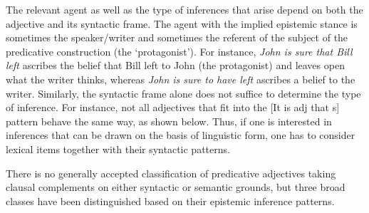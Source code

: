 \documentclass[10pt]{article}
\begin{document}
The relevant agent as well as the type of inferences that arise depend
on both the adjective and its syntactic frame.  The agent with the
implied epistemic stance is sometimes the speaker/writer and sometimes
the referent of the subject of the predicative construction (the
`protagonist').  For instance, \textit{John is sure that Bill left}
ascribes the belief that Bill left to John (the protagonist) and
leaves open what the writer thinks, whereas \textit{John is sure to have
left} ascribes a belief to the writer. Similarly, the syntactic frame
alone does not suffice to determine the type of inference. For
instance, not all adjectives that fit into the [It is {\sc adj} that
  {\sc s}] pattern behave the same way, as shown below.  Thus, if one
is interested in inferences that can be drawn on the basis of
linguistic form, one has to consider lexical items together with their
syntactic patterns.

There is no generally accepted classification of predicative adjectives taking clausal complements on either syntactic or semantic grounds, but three broad classes have been distinguished based on their epistemic inference patterns. 

\vspace{-.1in}
\end{document}
